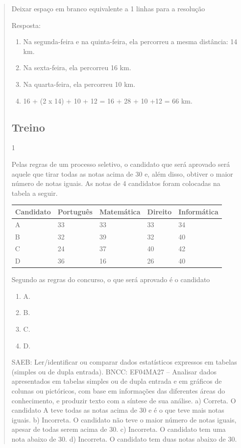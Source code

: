 \begin{mdframed}[linewidth=2pt,linecolor=salmao,roundcorner=2pt]
\begin{itemize}
{\begin{itemize}
\begin{escolha}
{\begin{quote}
{\begin{escolha}
{{{Deixar espaço em branco equivalente a 1 linhas para a resolução

Resposta:

\begin{enumerate}
\item
  Na segunda-feira e na quinta-feira, ela percorreu a mesma distância: 14 km.
\item
  Na sexta-feira, ela percorreu 16 km.
\item
  Na quarta-feira, ela percorreu 10 km.
\item
  16 + (2 x 14) + 10 + 12 = 16 + 28 + 10 +12 = 66 km.
\end{enumerate}

\subsection{Treino}

\num{1}

Pelas regras de um processo seletivo, o candidato que será aprovado será
aquele que tirar todas as notas acima de 30 e, além disso, obtiver o maior
número de notas iguais. As notas de 4 candidatos foram colocadas na
tabela a seguir.

\begin{longtable}[]{@{}lllll@{}}
\toprule
Candidato & Português & Matemática & Direito &
Informática\tabularnewline
\midrule
\endhead
A & 33 & 33 & 33 & 34\tabularnewline
B & 32 & 39 & 32 & 40\tabularnewline
C & 24 & 37 & 40 & 42\tabularnewline
D & 36 & 16 & 26 & 40\tabularnewline
\bottomrule
\end{longtable}

Segundo as regras do concurso, o que será aprovado é o candidato

\begin{enumerate}
\item
  A.
\item
  B.
\item
  C.
\item
  D.
\end{enumerate}

SAEB: Ler/identificar ou comparar dados estatísticos expressos em tabelas (simples ou de dupla entrada).
BNCC: EF04MA27 -- Analisar dados apresentados em tabelas simples ou de dupla entrada e em gráficos de
colunas ou pictóricos, com base em informações das diferentes áreas do conhecimento, e produzir
texto com a síntese de sua análise.
a) Correta. O candidato A teve todas as notas acima de 30 e é o que teve mais notas iguais.
b) Incorreta. O candidato não teve o maior número de notas iguais, apesar de todas serem acima de 30.
c) Incorreta. O candidato tem uma nota abaixo de 30.
d) Incorreta. O candidato tem duas notas abaixo de 30.


}}}
\end{escolha}}
\end{quote}}
\end{escolha}
\end{itemize}}
\end{itemize}
\end{mdframed}
